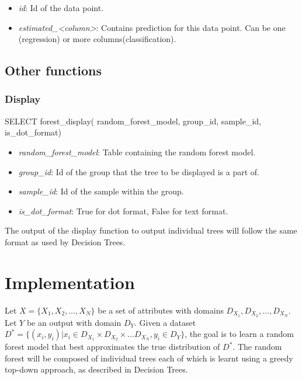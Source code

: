 \begin{itemize}
    \item \emph{id}: Id of the data point.
    \item \emph{estimated\_<column>}: Contains prediction for this data point. Can be one (regression)
    or more columns(classification).
\end{itemize}

\subsection{Other functions}
\label{sub:others}
\subsubsection{Display} %
\label{sub:display}
\begin{sql}
    SELECT forest_display(
          random_forest_model,
          group_id,
          sample_id,
          is_dot_format)
          
\end{sql}

\begin{itemize}
    \item \emph{random\_forest\_model}: Table containing the random forest model.
    \item \emph{group\_id}: Id of the group that the tree to be displayed is a part of.
    \item \emph{sample\_id}: Id of the sample within the group.
    \item \emph{is\_dot\_format}: True for dot format, False for text format.
\end{itemize}

The output of the display function to output individual trees will follow the same format as used by
Decision Trees.


\section{Implementation} %
\label{sec:implementation}

Let $X = \{X_1, X_2, \dots, X_N\}$ be a set of attributes with domains
$D_{X_1}, D_{X_2}, \dots, D_{X_N}$. Let $Y$ be an output with domain $D_Y$.
Given a dataset $D^* = \{(x_i, y_i) | x_i \in D_{X_1} \times D_{X_2} \times \dots D_{X_N}, y_i \in D_Y\}$,
the goal is to learn a random forest model that best approximates the true
distribution of $D^*$. The random forest will be composed of individual trees
each of which is learnt using a greedy top-down approach, as described in
Decision Trees.

